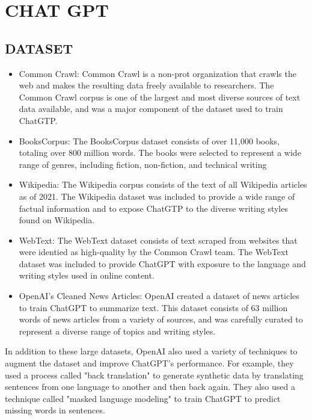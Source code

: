 \documentclass[letterpaper, 10 pt, conference]{ieeeconf}  %
\begin{document}
\section{CHAT GPT}



\subsection{DATASET}
\begin{itemize}


\item Common Crawl: Common Crawl is a non-prot organization that crawls the web and makes the resulting data freely
available to researchers. The Common Crawl corpus is one of the largest and most diverse sources of text data available,
and was a major component of the dataset used to train ChatGTP.
\item BooksCorpus: The BooksCorpus dataset consists of over 11,000 books, totaling over 800 million words. The books
were selected to represent a wide range of genres, including fiction, non-fiction, and technical writing
\item Wikipedia: The Wikipedia corpus consists of the text of all Wikipedia articles as of 2021. The Wikipedia dataset was
included to provide a wide range of factual information and to expose ChatGTP to the diverse writing styles found on
Wikipedia.
\item WebText: The WebText dataset consists of text scraped from websites that were identied as high-quality by the Common
Crawl team. The WebText dataset was included to provide ChatGPT with exposure to the language and writing styles
used in online content.
\item OpenAI's Cleaned News Articles: OpenAI created a dataset of news articles to train ChatGPT to summarize text.
This dataset consists of 63 million words of news articles from a variety of sources, and was carefully curated to represent
a diverse range of topics and writing styles.

\end{itemize}

In addition to these large datasets, OpenAI also used a variety of techniques to augment the dataset and improve ChatGPT’s
performance. For example, they used a process called "back translation" to generate synthetic data by translating sentences from
one language to another and then back again. They also used a technique called "masked language modeling" to train ChatGPT to
predict missing words in sentences.
\end{document}
